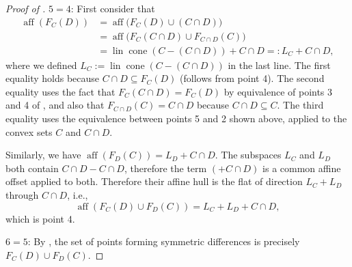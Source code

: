 \documentclass[10pt,a4paper]{amsart}
\DeclareMathOperator{\aff}{aff}
\DeclareMathOperator{\cone}{cone}
\DeclareMathOperator{\lin}{lin}
\begin{document}
\begin{proof}[\hypertarget{loc:affine_cross:lineality.proof}{}Proof of ]
$5 = 4$:
First consider that
\begin{align*}
\aff(F_C(D)) &= \aff\bigl(F_C(D) \cup (C \cap D)\bigr) \\
&= \aff\bigl(F_C(C \cap D) \cup F_{C \cap D}(C)\bigr) \\
&= \lin\cone(C - (C \cap D)) + C \cap D =: L_C + C \cap D,
\end{align*}
where we defined $L_C := \lin \cone(C-(C \cap D))$ in the last line. The first equality holds because $C \cap D \subseteq F_C(D)$ (follows from  point 4). The second equality uses the fact that $F_C(C \cap D) = F_C(D)$ by equivalence of points 3 and 4 of , and also that $F_{C \cap D}(C) = C \cap D$ because $C \cap D \subseteq C$. The third equality uses the equivalence between
points 5 and 2 shown above, applied to the convex sets $C$ and $C \cap D$.

Similarly, we have $\aff(F_D(C)) = L_D + C \cap D$. The subspaces $L_C$ and $L_D$ both contain $C \cap D - C \cap D$, therefore the term $(+ C \cap D)$ is a common affine offset applied to both. Therefore their affine hull is the flat of direction $L_C + L_D$ through $C \cap D$, i.e.,
\begin{equation*}
\aff(F_C(D) \cup F_D(C)) = L_C + L_D + C \cap D,
\end{equation*}
which is point 4.

$6 = 5$:
By ,
the set of points forming symmetric differences is
precisely $F_C(D) \cup F_D(C)$.
\end{proof}
\end{document}
